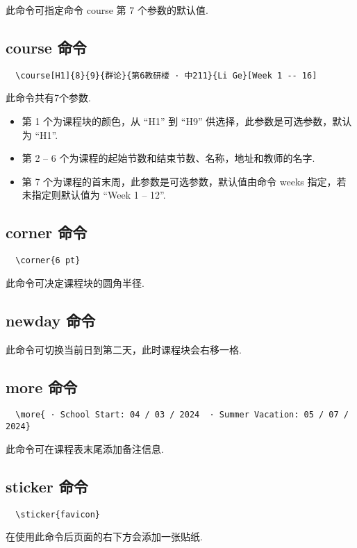 \documentclass[11pt]{article}
\def\cmd#1{\texorpdfstring{\textcolor{cmdcolor}{\textsf{#1}}}{“#1”}}
\begin{document}
此命令可指定命令 \cmd{course} 第 7 个参数的默认值.

\subsection{\cmd{course} 命令}
\begin{verbatim}
  \course[H1]{8}{9}{群论}{第6教研楼 · 中211}{Li Ge}[Week 1 -- 16]
\end{verbatim}

此命令共有7个参数.
\begin{itemize}
  \item 第 1 个为课程块的颜色，从 ``H1'' 到 ``H9'' 供选择，此参数是可选参数，默认为 ``H1''.
  \item 第 2 -- 6 个为课程的起始节数和结束节数、名称，地址和教师的名字.
  \item 第 7 个为课程的首末周，此参数是可选参数，默认值由命令 \cmd{weeks} 指定，若未指定则默认值为 ``Week 1 -- 12''.
\end{itemize}

\subsection{\cmd{corner} 命令}
\begin{verbatim}
  \corner{6 pt}
\end{verbatim}

此命令可决定课程块的圆角半径.

\subsection{\cmd{newday} 命令}
此命令可切换当前日到第二天，此时课程块会右移一格.

\subsection{\cmd{more} 命令}
\begin{verbatim}
  \more{ · School Start: 04 / 03 / 2024  · Summer Vacation: 05 / 07 / 2024}
\end{verbatim}
此命令可在课程表末尾添加备注信息.

\subsection{\cmd{sticker} 命令}
\begin{verbatim}
  \sticker{favicon}
\end{verbatim}
在使用此命令后页面的右下方会添加一张贴纸.
\end{document}
